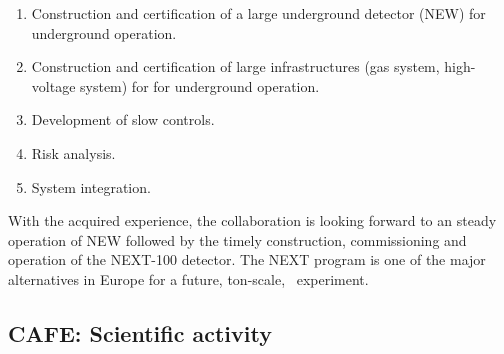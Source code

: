 \begin{enumerate}
\item Construction and certification of a large underground detector (NEW) for underground operation.
\item Construction and certification of large infrastructures (gas system, high-voltage system) for for underground operation.
\item Development of slow controls.
\item Risk analysis.
\item System integration.
\end{enumerate}

With the acquired experience, the collaboration is looking forward to an steady operation of NEW followed by the
timely construction, commissioning and operation of the NEXT-100 detector. The NEXT program is one of the major alternatives in Europe for a future, ton-scale, \bbonu\ experiment. 


\subsection*{CAFE: Scientific activity}

